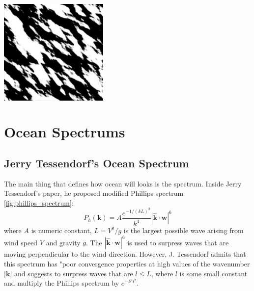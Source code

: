 \begin{minipage}{1\textwidth}
    \centering
    \includegraphics[width=0.4\textwidth]{"images/philips_height_map.png"}
\end{minipage}

\section{Ocean Spectrums}
\subsection{Jerry Tessendorf's Ocean Spectrum}
The main thing that defines how ocean will looks is the spectrum. Inside Jerry Tessendorf's \cite{tessendorf2001} paper, he proposed modified Phillips spectrum \ref{fig:phillips_spectrum}:
\begin{equation}
    P_h(\mathbf{k}) = A \frac{e^{-1/(kL)^{2}}}{k^{4}}| \mathbf{\hat{k}} \cdot \mathbf{w} |^{6}
    \label{eq:tessendorf_spectrum}
\end{equation}
where $A$ is numeric constant, $L = V^2/g$ is the largest possible wave arising from wind speed $V$ and gravity $g$. The $| \mathbf{\hat{k}} \cdot \mathbf{w} |^{6}$ is used to surpress waves that are moving perpendicular to the wind direction.
However, J. Tessendorf admits that this spectrum has "poor convergence properties at high values of the wavenumber $|\mathbf{k}|$ and suggests to surpress waves that are $l \leq L$, where $l$ is some small constant and multiply the Phillips spectrum by $e^{-k^2l^2}$.

